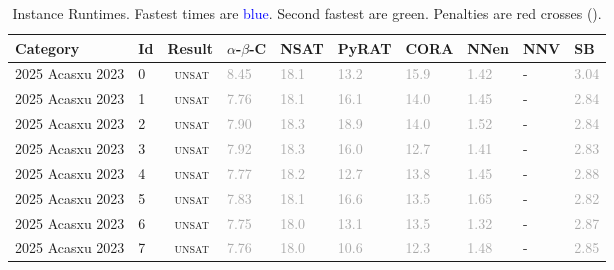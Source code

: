 

\begin{center}
{\setlength{\tabcolsep}{1pt}
\scriptsize
\begin{longtable}{@{}llllllllll@{}}
\caption{\footnotesize Instance Runtimes. Fastest times are \textcolor{blue}{blue}. Second fastest are \textcolor{second}{green}. Penalties are red crosses (\textbf{\textcolor{red}{}}).} \label{tab:all_results} \\
\toprule
\textbf{Category} & \textbf{Id} & \textbf{Result} & \textbf{$\alpha$-$\beta$-C} & \textbf{NSAT} & \textbf{PyRAT} & \textbf{CORA} & \textbf{NNen} & \textbf{NNV} & \textbf{SB} \\
\midrule
\endhead
2025 Acasxu 2023 & 0 & ~\textsc{unsat} & \textcolor{darkgray}{8.45} & \textcolor{darkgray}{18.1} & \textcolor{darkgray}{13.2} & \textcolor{darkgray}{15.9} & \textcolor{darkgray}{1.42} & - & \textcolor{darkgray}{3.04} \\
2025 Acasxu 2023 & 1 & ~\textsc{unsat} & \textcolor{darkgray}{7.76} & \textcolor{darkgray}{18.1} & \textcolor{darkgray}{16.1} & \textcolor{darkgray}{14.0} & \textcolor{darkgray}{1.45} & - & \textcolor{darkgray}{2.84} \\
2025 Acasxu 2023 & 2 & ~\textsc{unsat} & \textcolor{darkgray}{7.90} & \textcolor{darkgray}{18.3} & \textcolor{darkgray}{18.9} & \textcolor{darkgray}{14.0} & \textcolor{darkgray}{1.52} & - & \textcolor{darkgray}{2.84} \\
2025 Acasxu 2023 & 3 & ~\textsc{unsat} & \textcolor{darkgray}{7.92} & \textcolor{darkgray}{18.3} & \textcolor{darkgray}{16.0} & \textcolor{darkgray}{12.7} & \textcolor{darkgray}{1.41} & - & \textcolor{darkgray}{2.83} \\
2025 Acasxu 2023 & 4 & ~\textsc{unsat} & \textcolor{darkgray}{7.77} & \textcolor{darkgray}{18.2} & \textcolor{darkgray}{12.7} & \textcolor{darkgray}{13.8} & \textcolor{darkgray}{1.45} & - & \textcolor{darkgray}{2.88} \\
2025 Acasxu 2023 & 5 & ~\textsc{unsat} & \textcolor{darkgray}{7.83} & \textcolor{darkgray}{18.1} & \textcolor{darkgray}{16.6} & \textcolor{darkgray}{13.5} & \textcolor{darkgray}{1.65} & - & \textcolor{darkgray}{2.82} \\
2025 Acasxu 2023 & 6 & ~\textsc{unsat} & \textcolor{darkgray}{7.75} & \textcolor{darkgray}{18.0} & \textcolor{darkgray}{13.1} & \textcolor{darkgray}{13.5} & \textcolor{darkgray}{1.32} & - & \textcolor{darkgray}{2.87} \\
2025 Acasxu 2023 & 7 & ~\textsc{unsat} & \textcolor{darkgray}{7.76} & \textcolor{darkgray}{18.0} & \textcolor{darkgray}{10.6} & \textcolor{darkgray}{12.3} & \textcolor{darkgray}{1.48} & - & \textcolor{darkgray}{2.85} \\

\end{longtable}}
\end{center}
